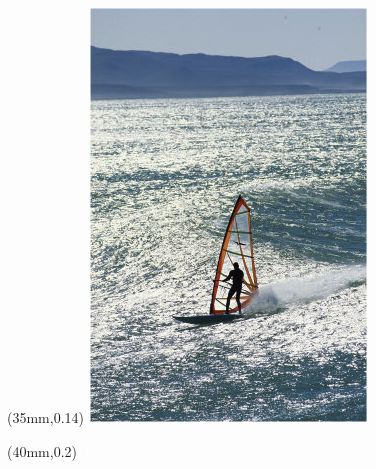 \documentclass[10pt]{beamer}
\newcommand{\death}[1]{{\textcolor{white}{#1}}}
\begin{document}
\begin{frame}{}

\begin{textblock*}{60mm}(35mm,0.14\textheight)
\includegraphics[width=.90\linewidth]{graphics/123354.png}
\end{textblock*}

\begin{textblock*}{100mm}(40mm,0.2\textheight)
\Huge{\death{Thank You!}}
\end{textblock*}


\end{frame}
\end{document}
